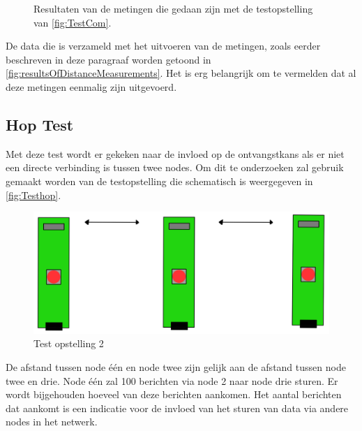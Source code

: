 \begin{figure}[ht]
    \centering
    \caption{Resultaten van de metingen die gedaan zijn met de testopstelling van \autoref{fig:TestCom}.}
    \label{fig:resultsOfDistanceMeasurements}
\end{figure}
De data die is verzameld met het uitvoeren van de metingen, zoals eerder beschreven in deze paragraaf worden getoond in \autoref{fig:resultsOfDistanceMeasurements}. Het is erg belangrijk om te vermelden dat al deze metingen eenmalig zijn uitgevoerd.

\subsection{Hop Test} \label{sec:influenceOfHopsInNetwork}
Met deze test wordt er gekeken naar de invloed op de ontvangstkans als er niet een directe verbinding is tussen twee nodes. Om dit te onderzoeken zal gebruik gemaakt worden van de testopstelling die schematisch is weergegeven in \autoref{fig:Testhop}. 
\begin{figure}[h]
    \centering
    \includegraphics[scale = 0.4]{img/test2.png}
    \caption{Test opstelling 2}
    \label{fig:Testhop}
\end{figure}
De afstand tussen node één en node twee zijn gelijk aan de afstand tussen node twee en drie. Node één zal 100 berichten via node 2 naar node drie sturen. Er wordt bijgehouden hoeveel van deze berichten aankomen. Het aantal berichten dat aankomt is een indicatie voor de invloed van het sturen van data via andere nodes in het netwerk.

